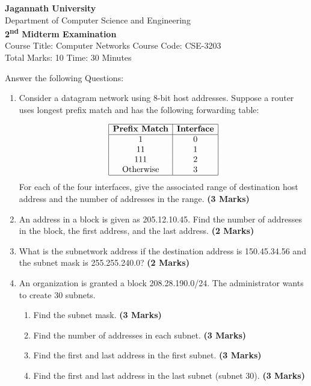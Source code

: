 \documentclass{article}
\begin{document}
\begin{center}
    \textbf{Jagannath University} \\
    Department of Computer Science and Engineering \\
    \textbf{2\textsuperscript{nd} Midterm Examination} \\
    Course Title: Computer Networks \hspace{0.2cm} Course Code: CSE-3203 \\
    Total Marks: 10 \hspace{0.2cm} Time: 30 Minutes
\end{center}

\noindent Answer the following Questions:

\begin{enumerate}
    \item Consider a datagram network using 8-bit host addresses. Suppose a router uses longest prefix match and has the following forwarding table:
    
    \[
    \begin{array}{|c|c|}
    \hline
    \textbf{Prefix Match} & \textbf{Interface} \\
    \hline
    1 & 0 \\
    11 & 1 \\
    111 & 2 \\
    \text{Otherwise} & 3 \\
    \hline
    \end{array}
    \]
    For each of the four interfaces, give the associated range of destination host address and the number of addresses in the range. \hspace{1cm} \textbf{(3 Marks)}
    
    \item An address in a block is given as 205.12.10.45. Find the number of addresses in the block, the first address, and the last address. \hspace{1cm} \textbf{(2 Marks)}
    
    \item What is the subnetwork address if the destination address is 150.45.34.56 and the subnet mask is 255.255.240.0? \hspace{1cm} \textbf{(2 Marks)}
    
    \item An organization is granted a block 208.28.190.0/24. The administrator wants to create 30 subnets.
    \begin{enumerate}
        \item Find the subnet mask. \hspace{1cm} \textbf{(3 Marks)}
        \item Find the number of addresses in each subnet. \hspace{1cm} \textbf{(3 Marks)}
        \item Find the first and last address in the first subnet. \hspace{1cm} \textbf{(3 Marks)}
        \item Find the first and last address in the last subnet (subnet 30). \hspace{1cm} \textbf{(3 Marks)}
    \end{enumerate}
\end{enumerate}
\end{document}
